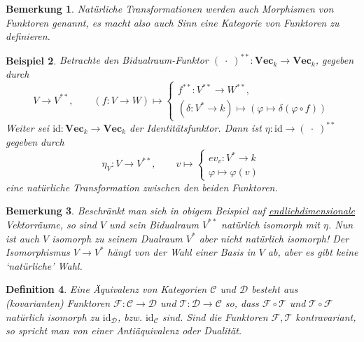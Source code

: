 \documentclass[a4paper, 11pt]{scrartcl}
\newcommand{\id}{\text{id}}
\theoremstyle{basicstyle}
\newtheorem{definition}{Definition}[section]
\newtheorem{bemerkung}[definition]{Bemerkung}
\newtheorem{beispiel}[definition]{Beispiel}
\begin{document}
    \begin{bemerkung}
        Natürliche Transformationen werden auch \emph{Morphismen von Funktoren} genannt, es macht also auch Sinn eine Kategorie von Funktoren zu definieren.
    \end{bemerkung}

    \begin{beispiel}
        Betrachte den Bidualraum-Funktor \((\;\cdot\;)^{\ast\ast}: \textbf{Vec}_k \to \textbf{Vec}_k\), gegeben durch
        \begin{equation*}
            V \to V^{\ast\ast}, \qquad
            (f: V \to W) \mapsto \begin{cases}
                f^{\ast\ast}: V^{\ast\ast} \to W^{\ast\ast}, \\
                (\delta: V^\ast \to k) \mapsto (\varphi \mapsto \delta(\varphi \circ f))
            \end{cases}
        \end{equation*}
        Weiter sei \(\id: \textbf{Vec}_k \to \textbf{Vec}_k\) der Identitätsfunktor.
        Dann ist \(\eta: \id \to (\;\cdot\;)^{\ast\ast}\) gegeben durch
        \begin{equation*}
            \eta_V : V \longrightarrow V^{\ast\ast}, \qquad v \mapsto \begin{cases}
                ev_v: V^\ast \to k \\
                \varphi \mapsto \varphi(v)
            \end{cases}
        \end{equation*}
        eine natürliche Transformation zwischen den beiden Funktoren.
    \end{beispiel}

    \begin{bemerkung}
        Beschränkt man sich in obigem Beispiel auf \underline{endlichdimensionale} Vektorräume, so sind \(V\) und sein Bidualraum \(V^{\ast\ast}\) natürlich isomorph mit \(\eta\).
        Nun ist auch \(V\) isomorph zu seinem Dualraum \(V^\ast\) aber nicht natürlich isomorph!
        Der Isomorphismus \(V \to V^\ast\) hängt von der Wahl einer Basis in \(V\) ab, aber es gibt keine `natürliche' Wahl.
    \end{bemerkung}

    \begin{definition}
        Eine \emph{Äquivalenz von Kategorien} \(\mathcal{C}\) und \(\mathcal{D}\) besteht aus (kovarianten) Funktoren \(\mathcal{F} : \mathcal{C} \to \mathcal{D}\) und \(\mathcal{T} : \mathcal{D} \to \mathcal{C}\) so, dass \(\mathcal{F} \circ \mathcal{T}\) und \(\mathcal{T} \circ \mathcal{F}\) natürlich isomorph zu \(\id_{\mathcal{D}}\), bzw. \(\id_{\mathcal{C}}\) sind.
        Sind die Funktoren \(\mathcal{F}, \mathcal{T}\) kontravariant, so spricht man von einer \emph{Antiäquivalenz} oder \emph{Dualität}.
    \end{definition}
\end{document}

